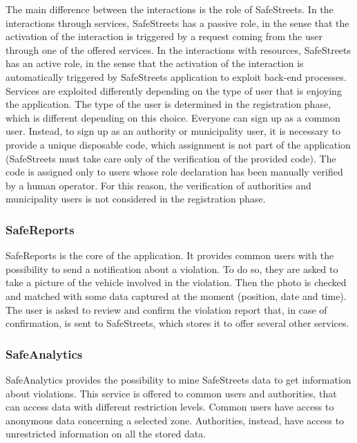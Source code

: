 \documentclass[a4paper]{article}
\begin{document}
The main difference between the interactions is the role of SafeStreets.
In the interactions through services, SafeStreets has a
passive role, in the sense that the activation of the interaction is
triggered by a request coming from the user through one of the offered
services. In the interactions with resources, SafeStreets has an active
role, in the sense that the activation of the interaction is
automatically triggered by SafeStreets application to exploit back-end
processes.
\medskip\\
Services are exploited differently depending on the type of user that is
enjoying the application. The type of the user is determined in the
registration phase, which is different depending on this choice.
Everyone can sign up as a common user. Instead, to sign up as an
authority or municipality user, it is necessary to provide a unique
disposable code, which assignment is not part of the application
(SafeStreets must take care only of the verification of the provided
code). The code is assigned only to users whose role declaration has
been manually verified by a human operator. For this reason, the
verification of authorities and municipality users is not considered in
the registration phase.

\subsubsection{SafeReports}

SafeReports is the core of the application. It provides common users
with the possibility to send a notification about a violation. To do so,
they are asked to take a picture of the vehicle involved in the
violation. Then the photo is checked and matched with some data captured
at the moment (position, date and time). The user is asked to review and
confirm the violation report that, in case of confirmation, is sent to
SafeStreets, which stores it to offer several other services.

\subsubsection{SafeAnalytics}

SafeAnalytics provides the possibility to mine SafeStreets data to get
information about violations. This service is offered to common users
and authorities, that can access data with different restriction levels.
Common users have access to anonymous data concerning a selected zone.
Authorities, instead, have access to unrestricted information on all the
stored data.
\end{document}
